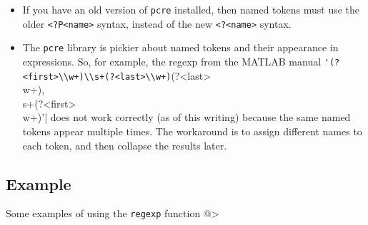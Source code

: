 \begin{itemize}
\item  If you have an old version of \verb|pcre| installed, then named tokens must use the
older \verb|<?P<name>| syntax, instead of the new \verb|<?<name>| syntax.  

\item  The \verb|pcre| library is pickier about named tokens and their appearance in 
expressions.  So, for example, the regexp from the MATLAB 
manual \verb|'(?<first>\\w+)\\s+(?<last>\\w+)|(?<last>\\w+),\\s+(?<first>\\w+)'|
does not work correctly (as of this writing) because the same named 
tokens appear multiple
times.  The workaround is to assign different names to each token, and then collapse
the results later.

\end{itemize}
\subsection{Example}

Some examples of using the \verb|regexp| function
@>
